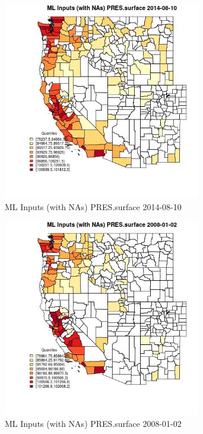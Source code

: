 \begin{figure} 
\centering  
\includegraphics[width=0.77\textwidth]{Code_Outputs/Report_ML_input_PM25_Step4_part_e_de_duplicated_aves_compiled_2019-05-18wNAs_CountyPRESsurfaceMean2014-08-10_2014-08-10.jpg} 
\caption{\label{fig:Report_ML_input_PM25_Step4_part_e_de_duplicated_aves_compiled_2019-05-18wNAsCountyPRESsurfaceMean2014-08-10_2014-08-10}ML Inputs (with NAs) PRES.surface 2014-08-10} 
\end{figure} 
 

\begin{figure} 
\centering  
\includegraphics[width=0.77\textwidth]{Code_Outputs/Report_ML_input_PM25_Step4_part_e_de_duplicated_aves_compiled_2019-05-18wNAs_CountyPRESsurfaceMean2008-01-02_2008-01-02.jpg} 
\caption{\label{fig:Report_ML_input_PM25_Step4_part_e_de_duplicated_aves_compiled_2019-05-18wNAsCountyPRESsurfaceMean2008-01-02_2008-01-02}ML Inputs (with NAs) PRES.surface 2008-01-02} 
\end{figure} 
 


